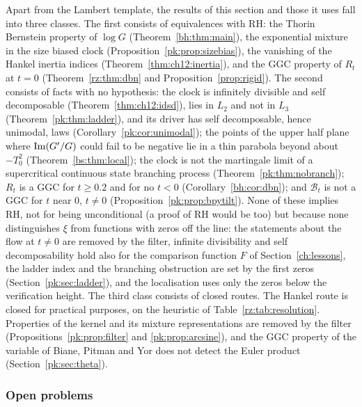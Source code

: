 Apart from the Lambert template, the results of this section and those it uses fall into three classes. The first consists of equivalences with RH: the Thorin Bernstein property of $\log G$ (Theorem~\ref{bh:thm:main}), the exponential mixture in the size biased clock (Proposition~\ref{pk:prop:sizebias}), the vanishing of the Hankel inertia indices (Theorem~\ref{thm:ch12:inertia}), and the GGC property of $R_t$ at $t=0$ (Theorem~\ref{rz:thm:dbn} and Proposition~\ref{prop:rigid}). The second consists of facts with no hypothesis: the clock is infinitely divisible and self decomposable (Theorem~\ref{thm:ch12:idsd}), lies in $L_2$ and not in $L_3$ (Theorem~\ref{pk:thm:ladder}), and its driver has self decomposable, hence unimodal, laws (Corollary~\ref{pk:cor:unimodal}); the points of the upper half plane where $\operatorname{Im}(G'/G)$ could fail to be negative lie in a thin parabola beyond about $-T_0^2$ (Theorem~\ref{bs:thm:local}); the clock is not the martingale limit of a supercritical continuous state branching process (Theorem~\ref{pk:thm:nobranch}); $R_t$ is a GGC for $t\ge0.2$ \cite{PT21} and for no $t<0$ (Corollary~\ref{bh:cor:dbn}); and $\mathcal B_t$ is not a GGC for $t$ near $0$, $t\ne0$ (Proposition~\ref{pk:prop:bpytilt}). None of these implies RH, not for being unconditional (a proof of RH would be too) but because none distinguishes $\xi$ from functions with zeros off the line: the statements about the flow at $t\ne0$ are removed by the filter, infinite divisibility and self decomposability hold also for the comparison function $F$ of Section~\ref{ch:lessons}, the ladder index and the branching obstruction are set by the first zeros (Section~\ref{pk:sec:ladder}), and the localisation uses only the zeros below the verification height. The third class consists of closed routes. The Hankel route is closed for practical purposes, on the heuristic of Table~\ref{rz:tab:resolution}. Properties of the kernel and its mixture representations are removed by the filter (Propositions~\ref{pk:prop:filter} and \ref{pk:prop:arcsine}), and the GGC property of the variable of Biane, Pitman and Yor does not detect the Euler product (Section~\ref{pk:sec:theta}).

\subsubsection{Open problems}\label{pk:sec:open}

